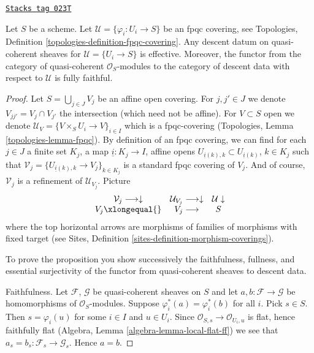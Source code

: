 \begin{proposition}
\label{descent-proposition-fpqc-descent-quasi-coherent}
\href{https://stacks.math.columbia.edu/tag/023T}{\texttt{Stacks tag 023T}}

Let $S$ be a scheme.
Let $\mathcal{U} = \{\varphi_i : U_i \to S\}$ be an fpqc covering, see
Topologies, Definition \ref{topologies-definition-fpqc-covering}.
Any descent datum on quasi-coherent sheaves
for $\mathcal{U} = \{U_i \to S\}$ is effective.
Moreover, the functor from the category of
quasi-coherent $\mathcal{O}_S$-modules to the category
of descent data with respect to $\mathcal{U}$ is fully faithful.
\end{proposition}

\begin{proof}

Let $S = \bigcup_{j \in J} V_j$ be an affine open covering.
For $j, j' \in J$ we denote $V_{jj'} = V_j \cap V_{j'}$ the intersection
(which need not be affine). For $V \subset S$ open we denote
$\mathcal{U}_V = \{V \times_S U_i \to V\}_{i \in I}$ which is a
fpqc-covering (Topologies, Lemma \ref{topologies-lemma-fpqc}).
By definition of an fpqc covering, we can find for each $j \in J$ a
finite set $K_j$, a map $\underline{i} : K_j \to I$,
affine opens $U_{\underline{i}(k), k} \subset U_{\underline{i}(k)}$,
$k \in K_j$ such that
$\mathcal{V}_j = \{U_{\underline{i}(k), k} \to V_j\}_{k \in K_j}$ is
a standard fpqc covering of $V_j$. And of course, $\mathcal{V}_j$
is a refinement of $\mathcal{U}_{V_j}$. Picture
$$
\begin{array}{ccc}\mathcal{V}_j \longrightarrow\downarrow & \mathcal{U}_{V_j} \longrightarrow\downarrow & \mathcal{U} \downarrow \\ V_j \xlongequal{} & V_j \longrightarrow & S\end{array}
$$
where the top horizontal arrows are morphisms of families of
morphisms with fixed target (see
Sites, Definition \ref{sites-definition-morphism-coverings}).

\medskip\noindent
To prove the proposition you show successively the
faithfulness, fullness, and essential surjectivity of the
functor from quasi-coherent sheaves to descent data.

\medskip\noindent
Faithfulness. Let $\mathcal{F}$, $\mathcal{G}$ be quasi-coherent
sheaves on $S$ and let $a, b : \mathcal{F} \to \mathcal{G}$ be
homomorphisms of $\mathcal{O}_S$-modules.
Suppose $\varphi_i^*(a) = \varphi_i^*(b)$ for all $i$.
Pick $s \in S$. Then $s = \varphi_i(u)$ for some $i \in I$ and
$u \in U_i$. Since $\mathcal{O}_{S, s} \to \mathcal{O}_{U_i, u}$
is flat, hence faithfully flat
(Algebra, Lemma \ref{algebra-lemma-local-flat-ff}) we see
that $a_s = b_s : \mathcal{F}_s \to \mathcal{G}_s$. Hence $a = b$.


\end{proof}
